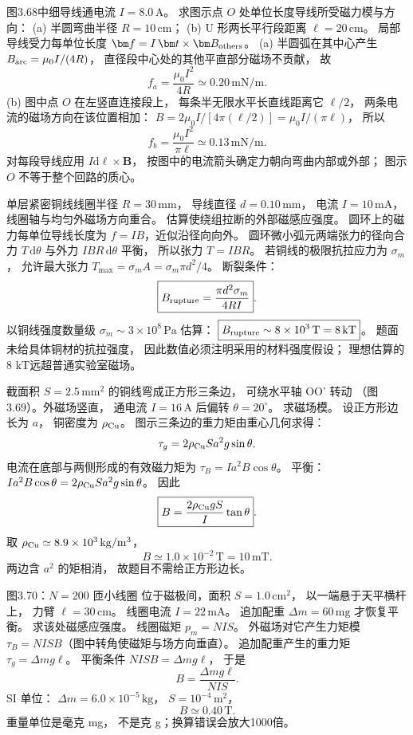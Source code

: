 图3.68中细导线通电流 $I=8.0\,\mathrm A$。
求图示点 $O$ 处单位长度导线所受磁力模与方向：
(a) 半圆弯曲半径 $R=10\,\mathrm{cm}$；
(b) U 形两长平行段距离 $\ell=20\,\mathrm{cm}$。
\exsolution
局部导线受力每单位长度
$\bm f=I\,\bm t\times\bm B_{\rm others}$。
(a) 半圆弧在其中心产生
$B_{\rm arc}=\mu_0I/(4R)$，
直径段中心处的其他平直部分磁场不贡献，
故
\[
\boxed{f_a=\frac{\mu_0I^2}{4R}
\simeq0.20\,\mathrm{mN/m}}.
\]
(b) 图中点 $O$ 在左竖直连接段上，
每条半无限水平长直线距离它 $\ell/2$，
两条电流的磁场方向在该位置相加：
$B=2\mu_0I/[4\pi(\ell/2)]
=\mu_0I/(\pi\ell)$，
所以
\[
\boxed{f_b=\frac{\mu_0I^2}{\pi\ell}
\simeq0.13\,\mathrm{mN/m}}.
\]
\excheck 对每段导线应用
$I\mathrm d\bm\ell\times\bm B$，
按图中的电流箭头确定力朝向弯曲内部或外部；
图示 $O$ 不等于整个回路的质心。

单层紧密铜线线圈半径 $R=30\,\mathrm{mm}$，
导线直径 $d=0.10\,\mathrm{mm}$，
电流 $I=10\,\mathrm{mA}$，
线圈轴与均匀外磁场方向重合。
估算使绕组拉断的外部磁感应强度。
\exsolution
圆环上的磁力每单位导线长度为
$f=IB$，近似沿径向向外。
圆环微小弧元两端张力的径向合力
$T\,\mathrm d\theta$
与外力
$IBR\,\mathrm d\theta$ 平衡，
所以张力 $T=IBR$。
若铜线的极限抗拉应力为 $\sigma_m$，
允许最大张力
$T_{\max}=\sigma_m A=
\sigma_m\pi d^2/4$。
断裂条件：
\[
\boxed{B_{\rm rupture}=
\frac{\pi d^2\sigma_m}{4RI}}.
\]
以铜线强度数量级
$\sigma_m\sim3\times10^8\,\mathrm{Pa}$
估算：
$\boxed{B_{\rm rupture}\sim8\times10^3\,\mathrm T
=8\,\mathrm{kT}}$。
\excheck 题面未给具体铜材的抗拉强度，
因此数值必须注明采用的材料强度假设；
理想估算的8 kT远超普通实验室磁场。

截面积 $S=2.5\,\mathrm{mm^2}$
的铜线弯成正方形三条边，
可绕水平轴 OO' 转动
（图3.69）。外磁场竖直，
通电流 $I=16\,\mathrm A$ 后偏转
$\theta=20^\circ$。
求磁场模。
\exsolution
设正方形边长为 $a$，
铜密度为 $\rho_{\rm Cu}$。
图示三条边的重力矩由重心几何求得：
\[
\tau_g=2\rho_{\rm Cu}Sa^2g\sin\theta.
\]
电流在底部与两侧形成的有效磁力矩为
$\tau_B=Ia^2B\cos\theta$。
平衡：
$Ia^2B\cos\theta
=2\rho_{\rm Cu}Sa^2g\sin\theta$。
因此
\[
\boxed{B=\frac{2\rho_{\rm Cu}gS}{I}\tan\theta}.
\]
取 $\rho_{\rm Cu}\simeq8.9\times10^3
\,\mathrm{kg/m^3}$，
\[
\boxed{B\simeq1.0\times10^{-2}\,\mathrm T
=10\,\mathrm{mT}}.
\]
\excheck 两边含 $a^2$ 的矩相消，
故题目不需给正方形边长。

图3.70：$N=200$ 匝小线圈
位于磁极间，面积
$S=1.0\,\mathrm{cm^2}$，
以一端悬于天平横杆上，
力臂 $\ell=30\,\mathrm{cm}$。
线圈电流
$I=22\,\mathrm{mA}$。
追加配重
$\Delta m=60\,\mathrm{mg}$
才恢复平衡。
求该处磁感应强度。
\exsolution
线圈磁矩
$p_m=NIS$。
外磁场对它产生力矩模
$\tau_B=NISB$（图中转角使磁矩与场方向垂直）。
追加配重产生的重力矩
$\tau_g=\Delta mg\ell$。
平衡条件
$NISB=\Delta mg\ell$，
于是
\[
\boxed{B=\frac{\Delta mg\ell}{NIS}}.
\]
SI 单位：
$\Delta m=6.0\times10^{-5}\,\mathrm{kg}$，
$S=10^{-4}\,\mathrm{m^2}$，
\[
\boxed{B\simeq0.40\,\mathrm T}.
\]
\excheck 重量单位是毫克 mg，
不是克 g；换算错误会放大1000倍。

